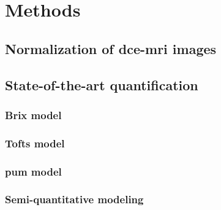\section{Methods}\label{sec:methods}

\subsection{Normalization of \ac{dce}-\ac{mri} images}\label{sec:norm}

\subsection{State-of-the-art quantification}\label{sec:stateart}

\subsubsection{Brix model}

\subsubsection{Tofts model}

\subsubsection{\acs*{pum} model}

\subsubsection{Semi-quantitative modeling}

